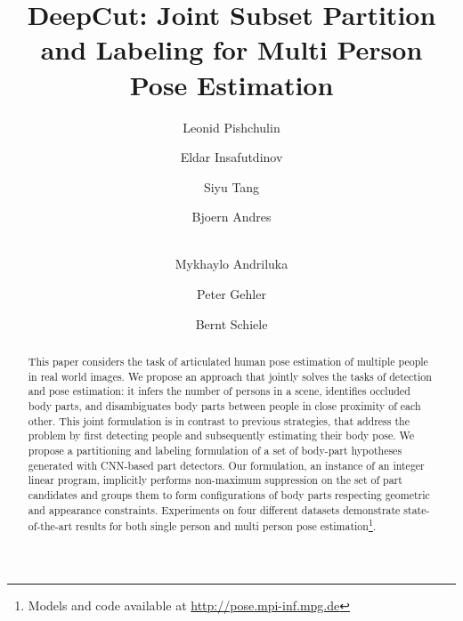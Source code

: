 \documentclass[10pt,twocolumn,letterpaper]{article}
\newcommand{\myurl}{\url{http://pose.mpi-inf.mpg.de}}
\begin{document}
\title{DeepCut: Joint Subset Partition and Labeling for Multi Person Pose Estimation}


\author[1]{Leonid Pishchulin}
\author[1]{Eldar Insafutdinov}
\author[1]{Siyu Tang}
\author[1]{Bjoern Andres}
\author[1,3]{\\Mykhaylo Andriluka}
\author[2]{Peter Gehler}
\author[1]{Bernt Schiele}


\maketitle

\begin{abstract}
  This paper considers the task of articulated human pose estimation
  of multiple people in real world images. We propose an approach that
  jointly solves the tasks of detection and pose estimation: it infers
  the number of persons in a scene, identifies occluded body parts,
  and disambiguates body parts between people in close proximity of
  each other. This joint formulation is in contrast to previous
  strategies, that address the problem by first detecting people and
  subsequently estimating their body pose. We propose a partitioning
  and labeling formulation of a set of body-part hypotheses generated
  with CNN-based part detectors. Our formulation, an instance of an
  integer linear program, implicitly performs non-maximum suppression
  on the set of part candidates and groups them to form configurations
  of body parts respecting geometric and appearance constraints.
  Experiments on four different datasets demonstrate state-of-the-art
  results for both single person and multi person pose
  estimation\footnote{Models and code available at \myurl}.
\end{abstract}
\end{document}
